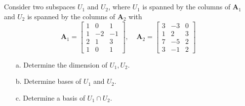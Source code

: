 \documentclass[a4paper,12pt]{article}
\newcommand{\M}[1]{ \begin{bmatrix} #1 \end{bmatrix} }
\newcommand{\matA}{\textbf{A}}
\begin{document}
\subsection{}
Consider two subspaces $U_1$ and $U_2$, where $U_1$ is spanned by the columns of $\matA_1$ and $U_2$ is spanned by the columns of $\matA_2$ with
$$\matA_1 = \M{1&0&1\\1&-2&-1\\2&1&3\\1&0&1}, \;\;\;\; \matA_2 = \M{3&-3&0\\1&2&3\\7&-5&2\\3&-1&2}$$

\begin{itemize}
 \item [a.] Determine the dimension of $U_1,U_2$.
 \item [b.] Determine bases of $U_1$ and $U_2$.
 \item [c.] Determine a basis of $U_1 \cap U_2$.
\end{itemize}
\end{document}
